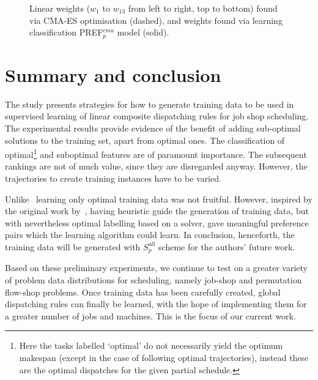 \documentclass[letterpaper]{article}
\newcommand{\PREF}[2]{PREF$_{#2}^{#1}$}
\begin{document}
\begin{figure}
\caption{Linear weights ($w_1$ to $w_{13}$ from left to right, top to bottom) found via CMA-ES optimisation (dashed), and weights found via learning classification \PREF{cma}{p} model (solid). }\label{fig:weights}
\end{figure}

\section{Summary and conclusion}\label{sec:summary}
The study presents strategies for how to generate training data to be used in supervised learning of linear composite dispatching rules for job shop scheduling.
The experimental results provide evidence of the benefit of adding sub-optimal solutions to the training set, apart from optimal ones.
The classification of optimal\footnote{Here the tasks labelled `optimal' do not necessarily yield the optimum makespan (except in the case of following optimal trajectories), instead these are the optimal dispatches for the given partial schedule.} and suboptimal features are of paramount importance. The subsequent rankings are not of much value, since they are disregarded anyway. However, the trajectories to create training instances have to be varied.

Unlike~\cite{Siggi10,Malik08,Russell09} learning only optimal training data was not fruitful. However, inspired by the original work by~\cite{Siggi05}, having heuristic guide the generation of training data, but with nevertheless optimal labelling based on a solver, gave meaningful preference pairs which the learning algorithm could learn. In conclusion, henceforth, the training data will be generated with $S_{p}^{all}$ scheme for the authors' future work.

Based on these preliminary experiments, we continue to test on a greater variety of problem data distributions for scheduling, namely job-shop and permutation flow-shop problems. Once training data has been carefully created, global dispatching rules can finally be learned, with the hope of implementing them for a greater number of jobs and machines. This is the focus of our current work.
 
\end{document}
